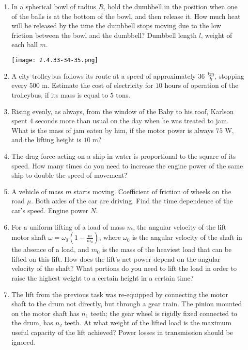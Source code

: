 \documentclass{article}
\begin{document}
\begin{enumerate}[label=2.4.\arabic*]
\item In a spherical bowl of radius $R$, hold the dumbbell in the position when one of the balls is at the bottom of the bowl, and then release it. How much heat will be released by the time the dumbbell stops moving due to the low friction between the bowl and the dumbbell? Dumbbell length $l$, weight of each ball $m$.

\begin{center}
    \texttt{[image: 2.4.33-34-35.png]}
\end{center}


\item A city trolleybus follows its route at a speed of approximately $36$ $\frac{km}{h}$, stopping every $500$ m. Estimate the cost of electricity for $10$ hours of operation of the trolleybus, if its mass is equal to $5$ tons.

\item Rising evenly, as always, from the window of the Baby to his roof, Karlson spent $4$ seconds more than usual on the day when he was treated to jam. What is the mass of jam eaten by him, if the motor power is always $75$ W, and the lifting height is $10$ m?

\item The drag force acting on a ship in water is proportional to the square of its speed. How many times do you need to increase the engine power of the same ship to double the speed of movement?

\item A vehicle of mass $m$ starts moving. Coefficient of friction of wheels on the road $\mu$. Both axles of the car are driving. Find the time dependence of the car's speed. Engine power $N$.

\item For a uniform lifting of a load of mass $m$, the angular velocity of the lift motor shaft $\omega = \omega_0(1 - \frac{m}{m_0})$, where $\omega_0$ is the angular velocity of the shaft in the absence of a load, and $m_0$ is the mass of the heaviest load that can be lifted on this lift. How does the lift's net power depend on the angular velocity of the shaft? What portions do you need to lift the load in order to raise the highest weight to a certain height in a certain time?

\item The lift from the previous task was re-equipped by connecting the motor shaft to the drum not directly, but through a gear train. The pinion mounted on the motor shaft has $n_1$ teeth; the gear wheel is rigidly fixed connected to the drum, has $n_2$ teeth. At what weight of the lifted load is the maximum useful capacity of the lift achieved? Power losses in transmission should be ignored.


\end{enumerate}
\end{document}
